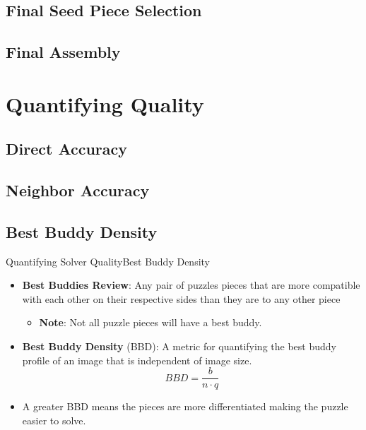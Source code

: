 \documentclass[10pt]{beamer}
\begin{document}
\subsection{Final Seed Piece Selection}
\subsection{Final Assembly}

\section{Quantifying Quality}
\subsection{Direct Accuracy}
\subsection{Neighbor Accuracy}



\subsection{Best Buddy Density}
\begin{frame}{Quantifying Solver Quality}{Best Buddy Density}
  \begin{itemize}
    \setlength\itemsep{1em}
    \item \textbf{Best Buddies Review}: Any pair of puzzles pieces that are more compatible with each other on their respective sides than they are to any other piece
    \begin{itemize}
      \item \textbf{Note}: Not all puzzle pieces will have a best buddy.
    \end{itemize}
    \vfill
    \item \textbf{Best Buddy Density} (BBD): A metric for quantifying the best buddy profile of an image that is independent of image size.
    \vfill
    \begin{equation} \label{eq:bestBuddyDensity}
      BBD = \frac{b}{n \cdot q}
    \end{equation}
    \vfill
    \item A greater BBD means the pieces are more differentiated making the puzzle easier to solve.
  \end{itemize}
\end{frame}
\end{document}
